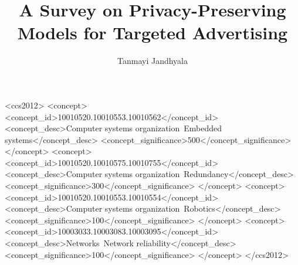 \documentclass[sigconf,nonacm]{acmart}
\begin{document}
\title{A Survey on Privacy-Preserving Models for Targeted Advertising}


\author{Tanmayi Jandhyala}
\affiliation{%
  \institution{Master of Engineering}
  \institution{Department of Electrical and Computer Engineering} 
  \institution{University of Waterloo}
  }




\begin{CCSXML}
<ccs2012>
 <concept>
  <concept_id>10010520.10010553.10010562</concept_id>
  <concept_desc>Computer systems organization~Embedded systems</concept_desc>
  <concept_significance>500</concept_significance>
 </concept>
 <concept>
  <concept_id>10010520.10010575.10010755</concept_id>
  <concept_desc>Computer systems organization~Redundancy</concept_desc>
  <concept_significance>300</concept_significance>
 </concept>
 <concept>
  <concept_id>10010520.10010553.10010554</concept_id>
  <concept_desc>Computer systems organization~Robotics</concept_desc>
  <concept_significance>100</concept_significance>
 </concept>
 <concept>
  <concept_id>10003033.10003083.10003095</concept_id>
  <concept_desc>Networks~Network reliability</concept_desc>
  <concept_significance>100</concept_significance>
 </concept>
</ccs2012>
\end{CCSXML}
\end{document}
